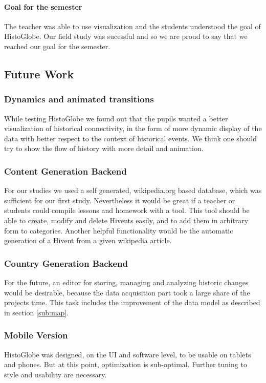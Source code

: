 \paragraph{Goal for the semester} %
The teacher was able to use visualization and the students understood the goal of HistoGlobe. Our field study was sucessful and so we are proud to say that we reached our goal for the semester.

\subsection{Future Work} %
\label{sub:future_work}

\subsubsection{Dynamics and animated transitions} %
\label{sub:dynamics_and_animated_transitions}
While testing HistoGlobe we found out that the pupils wanted a better visualization of historical connectivity, in the form of  more dynamic display of the data with better respect to the context of historical events. We think one should try to show the flow of history with more detail and animation.



\subsubsection{Content Generation Backend} %
\label{sub:content_generation_backend}

For our studies we used a self generated, wikipedia.org based database, which was sufficient for our first study. Nevertheless it would be great if a teacher or students could compile lessons and homework with a tool. This tool should be able to create, modify and delete Hivents easily, and to add them in arbitrary form to categories.
Another helpful functionality would be the automatic generation of a Hivent from a given wikipedia article.

\subsubsection{Country Generation Backend} %
\label{sub:country_generation_backend}
For the future, an editor for storing, managing and analyzing historic changes would be desirable, because the data acquisition part took a large share of the projects time. This task includes the improvement of the data model as described in section \ref{sub:map}.

\subsubsection{Mobile Version} %
\label{sub:mobile_version}
HistoGlobe was designed, on the UI and software level, to be usable on tablets and phones. But at this point, optimization is sub-optimal.
Further tuning to style and usability are necessary.

